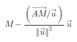 \begin{displaymath}
 M - \frac{(\overrightarrow{AM}/\overrightarrow{u})}{\Vert \overrightarrow u \Vert ^2}\, \overrightarrow u
\end{displaymath}
